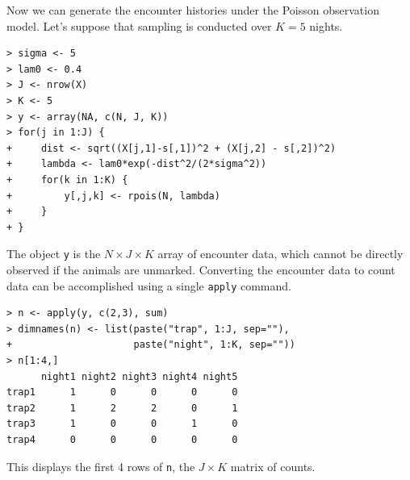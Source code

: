 Now we can generate the encounter histories under the
Poisson observation model. Let's suppose that sampling is conducted
over $K=5$ nights.
\begin{small}
\begin{verbatim}
> sigma <- 5
> lam0 <- 0.4
> J <- nrow(X)
> K <- 5
> y <- array(NA, c(N, J, K))
> for(j in 1:J) {
+     dist <- sqrt((X[j,1]-s[,1])^2 + (X[j,2] - s[,2])^2)
+     lambda <- lam0*exp(-dist^2/(2*sigma^2))
+     for(k in 1:K) {
+         y[,j,k] <- rpois(N, lambda)
+     }
+ }
\end{verbatim}
\end{small}
The object \verb+y+ is the $N \times J \times K$ array of encounter
data, which cannot be directly observed if the animals are unmarked.
Converting the encounter data to count data can be accomplished using a single
\verb+apply+ command.
\begin{small}
\begin{verbatim}
> n <- apply(y, c(2,3), sum)
> dimnames(n) <- list(paste("trap", 1:J, sep=""),
+                     paste("night", 1:K, sep=""))
> n[1:4,]
      night1 night2 night3 night4 night5
trap1      1      0      0      0      0
trap2      1      2      2      0      1
trap3      1      0      0      1      0
trap4      0      0      0      0      0
\end{verbatim}
\end{small}
This displays the first 4 rows of \verb+n+, the $J \times K$
matrix of counts.

